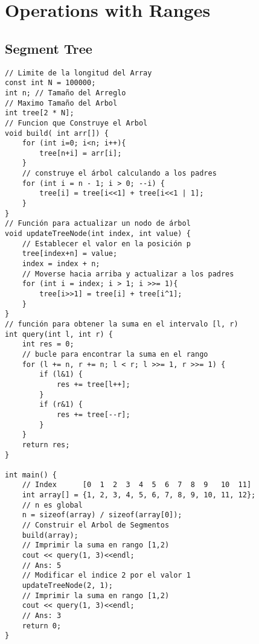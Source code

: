 \documentclass[10pt,letterpaper,twocolumn,twosided]{article}
\begin{document}
\section{Operations with Ranges}

\subsection{Segment Tree}
\begin{lstlisting}
// Limite de la longitud del Array
const int N = 100000;
int n; // Tamaño del Arreglo
// Maximo Tamaño del Arbol
int tree[2 * N];
// Funcion que Construye el Arbol
void build( int arr[]) {
    for (int i=0; i<n; i++){
        tree[n+i] = arr[i];
    }
    // construye el árbol calculando a los padres
    for (int i = n - 1; i > 0; --i) {
        tree[i] = tree[i<<1] + tree[i<<1 | 1];
    }
}
// Función para actualizar un nodo de árbol
void updateTreeNode(int index, int value) {
    // Establecer el valor en la posición p
    tree[index+n] = value;
    index = index + n;
    // Moverse hacia arriba y actualizar a los padres
    for (int i = index; i > 1; i >>= 1){
        tree[i>>1] = tree[i] + tree[i^1];
    }
}
// función para obtener la suma en el intervalo [l, r)
int query(int l, int r) {
    int res = 0;
    // bucle para encontrar la suma en el rango
    for (l += n, r += n; l < r; l >>= 1, r >>= 1) {
        if (l&1) {
            res += tree[l++];
        }
        if (r&1) {
            res += tree[--r];
        }
    }
    return res;
}

int main() {
    // Index      [0  1  2  3  4  5  6  7  8  9   10  11]
    int array[] = {1, 2, 3, 4, 5, 6, 7, 8, 9, 10, 11, 12};
    // n es global
    n = sizeof(array) / sizeof(array[0]);
    // Construir el Arbol de Segmentos
    build(array);
    // Imprimir la suma en rango [1,2)
    cout << query(1, 3)<<endl;
    // Ans: 5
    // Modificar el indice 2 por el valor 1
    updateTreeNode(2, 1);
    // Imprimir la suma en rango [1,2)
    cout << query(1, 3)<<endl;
    // Ans: 3
    return 0;
}
\end{lstlisting}
\end{document}
